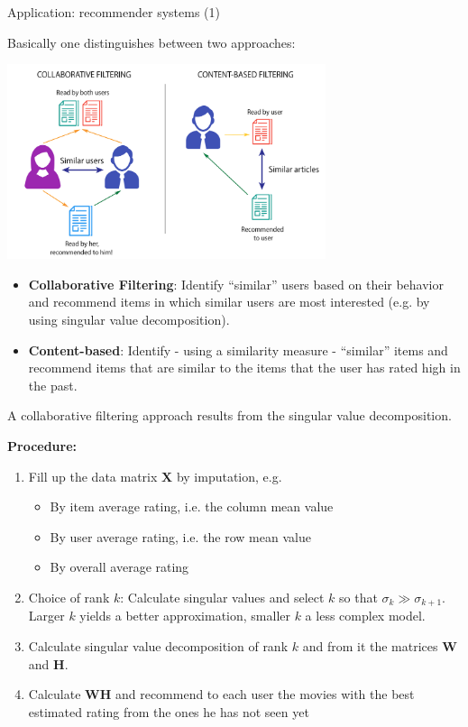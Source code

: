 \begin{vbframe}{Application: recommender systems (1)}
\framebreak

Basically one distinguishes between two approaches:

\begin{center}
	\includegraphics[width = 0.7\textwidth]{figure_man/ignore/recommender.png}
\end{center}

\framebreak

\begin{itemize}
\item \textbf{Collaborative Filtering}: Identify \enquote{similar} users based on their behavior and recommend items in which similar users are most interested (e.g. by using singular value decomposition).
\item \textbf{Content-based}: Identify - using a similarity measure - \enquote{similar} items and recommend items that are similar to the items that the user has rated high in the past.
\end{itemize}

\framebreak

A collaborative filtering approach results from the singular value decomposition.

\textbf{Procedure:}

\begin{enumerate}
\item Fill up the data matrix $\mathbf{X}$ by imputation, e.g.

\begin{itemize}
\item By item average rating, i.e. the column mean value
\item By user average rating, i.e. the row mean value
\item By overall average rating
\end{itemize}
\item Choice of rank $k$: Calculate singular values and select $k$ so that $\sigma_k \gg \sigma_{k + 1}$. Larger $k$ yields a better approximation, smaller $k$ a less complex model.
\item Calculate singular value decomposition of rank $k$ and from it the matrices $\mathbf{W}$ and $\mathbf{H}$.
\item Calculate $\mathbf{W}\mathbf{H}$ and recommend to each user the movies with the best estimated rating from the ones he has not seen yet
\end{enumerate}


\end{vbframe}
